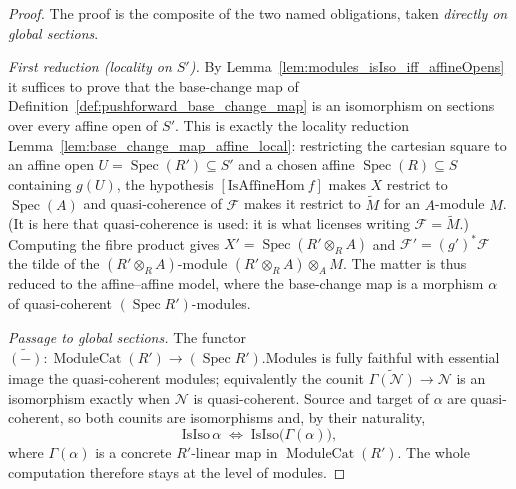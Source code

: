 \begin{proof}
  The proof is the composite of the two named obligations, taken \emph{directly on
  global sections}.

  \medskip
  \emph{First reduction (locality on \(S'\)).} By
  Lemma~\ref{lem:modules_isIso_iff_affineOpens} it suffices to prove that the
  base-change map of Definition~\ref{def:pushforward_base_change_map} is an
  isomorphism on sections over every affine open of \(S'\). This is exactly the
  locality reduction Lemma~\ref{lem:base_change_map_affine_local}: restricting the
  cartesian square to an affine open \(U = \operatorname{Spec}(R') \subseteq S'\) and
  a chosen affine \(\operatorname{Spec}(R) \subseteq S\) containing \(g(U)\), the
  hypothesis \([\mathrm{IsAffineHom}\ f]\) makes \(X\) restrict to
  \(\operatorname{Spec}(A)\) and quasi-coherence of \(\mathcal{F}\) makes it restrict
  to \(\widetilde{M}\) for an \(A\)-module \(M\). (It is here that quasi-coherence is
  used: it is what licenses writing \(\mathcal{F} = \widetilde{M}\).) Computing the
  fibre product gives \(X' = \operatorname{Spec}(R' \otimes_R A)\) and
  \(\mathcal{F}' = (g')^*\mathcal{F}\) the tilde of the \((R' \otimes_R A)\)-module
  \((R' \otimes_R A) \otimes_A M\). The matter is thus reduced to the affine--affine
  model, where the base-change map is a morphism \(\alpha\) of quasi-coherent
  \((\operatorname{Spec} R')\)-modules.

  \medskip
  \emph{Passage to global sections.} The functor
  \(\widetilde{(-)} : \operatorname{ModuleCat}(R') \to
  (\operatorname{Spec} R').\mathrm{Modules}\) is fully faithful with essential image
  the quasi-coherent modules; equivalently the counit
  \(\widetilde{\Gamma(\mathcal{N})} \to \mathcal{N}\) is an isomorphism exactly when
  \(\mathcal{N}\) is quasi-coherent. Source and target of \(\alpha\) are
  quasi-coherent, so both counits are isomorphisms and, by their naturality,
  \[
    \mathrm{IsIso}\,\alpha
    \;\Longleftrightarrow\;
    \mathrm{IsIso}\bigl(\Gamma(\alpha)\bigr),
  \]
  where \(\Gamma(\alpha)\) is a concrete \(R'\)-linear map in
  \(\operatorname{ModuleCat}(R')\). The whole computation therefore stays at the level
  of modules.


\end{proof}
